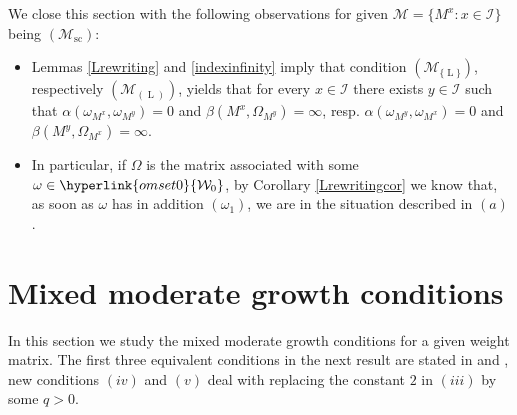 \documentclass[10pt]{amsart}%
\numberwithin{equation}{section}
\theoremstyle{plain}
\let\on=\operatorname
\begin{document}
We close this section with the following observations for given $\mathcal{M}=\{M^x: x\in\mathcal{I}\}$ being \hyperlink{Msc}{$(\mathcal{M}_{\on{sc}})$}:

\begin{itemize}
\item[$(a)$] Lemmas \ref{Lrewriting} and \ref{indexinfinity} imply that condition \hyperlink{R-L}{$(\mathcal{M}_{\{\on{L}\}})$}, respectively  \hyperlink{B-L}{$(\mathcal{M}_{(\on{L})})$}, yields that for every $x\in\mathcal{I}$ there exists $y\in\mathcal{I}$ such that
$\alpha(\omega_{M^x},\omega_{M^y})=0$ and
$\beta(M^x,\Omega_{M^y})=\infty$, resp. $\alpha(\omega_{M^y},\omega_{M^x})=0$ and
$\beta(M^y,\Omega_{M^x})=\infty$.

\item[$(b)$] In particular, if $\Omega$ is the matrix associated with some $\omega\in\hyperlink{omset0}{\mathcal{W}_0}$, by Corollary \ref{Lrewritingcor} we know that, as soon as $\omega$ has in addition \hyperlink{om1}{$(\omega_1)$}, we are in the situation described in $(a)$.
\end{itemize}



\section{Mixed moderate growth conditions}\label{mixedmgsection}
In this section we study the mixed moderate growth conditions for a given weight matrix. The first three equivalent conditions in the next result are stated  in \cite{testfunctioncharacterization} and \cite{dissertation}, new conditions $(iv)$ and $(v)$ deal with replacing the constant $2$ in $(iii)$ by some $q>0$.
\end{document}
